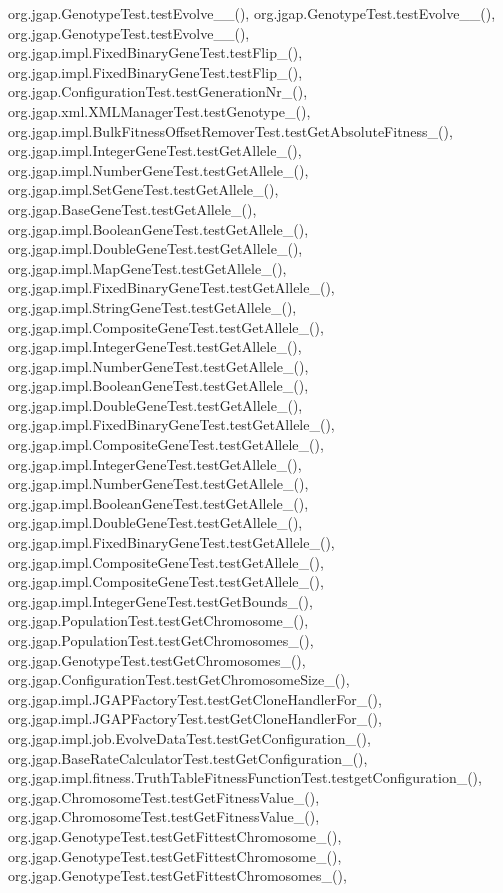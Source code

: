 org.\-jgap.\-Genotype\-Test.\-test\-Evolve\-\_\-\_(), org.\-jgap.\-Genotype\-Test.\-test\-Evolve\-\_\-\_(), org.\-jgap.\-Genotype\-Test.\-test\-Evolve\-\_\-\_(), org.\-jgap.\-impl.\-Fixed\-Binary\-Gene\-Test.\-test\-Flip\-\_(), org.\-jgap.\-impl.\-Fixed\-Binary\-Gene\-Test.\-test\-Flip\-\_(), org.\-jgap.\-Configuration\-Test.\-test\-Generation\-Nr\-\_(), org.\-jgap.\-xml.\-X\-M\-L\-Manager\-Test.\-test\-Genotype\-\_(), org.\-jgap.\-impl.\-Bulk\-Fitness\-Offset\-Remover\-Test.\-test\-Get\-Absolute\-Fitness\-\_(), org.\-jgap.\-impl.\-Integer\-Gene\-Test.\-test\-Get\-Allele\-\_(), org.\-jgap.\-impl.\-Number\-Gene\-Test.\-test\-Get\-Allele\-\_(), org.\-jgap.\-impl.\-Set\-Gene\-Test.\-test\-Get\-Allele\-\_(), org.\-jgap.\-Base\-Gene\-Test.\-test\-Get\-Allele\-\_(), org.\-jgap.\-impl.\-Boolean\-Gene\-Test.\-test\-Get\-Allele\-\_(), org.\-jgap.\-impl.\-Double\-Gene\-Test.\-test\-Get\-Allele\-\_(), org.\-jgap.\-impl.\-Map\-Gene\-Test.\-test\-Get\-Allele\-\_(), org.\-jgap.\-impl.\-Fixed\-Binary\-Gene\-Test.\-test\-Get\-Allele\-\_(), org.\-jgap.\-impl.\-String\-Gene\-Test.\-test\-Get\-Allele\-\_(), org.\-jgap.\-impl.\-Composite\-Gene\-Test.\-test\-Get\-Allele\-\_(), org.\-jgap.\-impl.\-Integer\-Gene\-Test.\-test\-Get\-Allele\-\_(), org.\-jgap.\-impl.\-Number\-Gene\-Test.\-test\-Get\-Allele\-\_(), org.\-jgap.\-impl.\-Boolean\-Gene\-Test.\-test\-Get\-Allele\-\_(), org.\-jgap.\-impl.\-Double\-Gene\-Test.\-test\-Get\-Allele\-\_(), org.\-jgap.\-impl.\-Fixed\-Binary\-Gene\-Test.\-test\-Get\-Allele\-\_(), org.\-jgap.\-impl.\-Composite\-Gene\-Test.\-test\-Get\-Allele\-\_(), org.\-jgap.\-impl.\-Integer\-Gene\-Test.\-test\-Get\-Allele\-\_(), org.\-jgap.\-impl.\-Number\-Gene\-Test.\-test\-Get\-Allele\-\_(), org.\-jgap.\-impl.\-Boolean\-Gene\-Test.\-test\-Get\-Allele\-\_(), org.\-jgap.\-impl.\-Double\-Gene\-Test.\-test\-Get\-Allele\-\_(), org.\-jgap.\-impl.\-Fixed\-Binary\-Gene\-Test.\-test\-Get\-Allele\-\_(), org.\-jgap.\-impl.\-Composite\-Gene\-Test.\-test\-Get\-Allele\-\_(), org.\-jgap.\-impl.\-Composite\-Gene\-Test.\-test\-Get\-Allele\-\_(), org.\-jgap.\-impl.\-Integer\-Gene\-Test.\-test\-Get\-Bounds\-\_(), org.\-jgap.\-Population\-Test.\-test\-Get\-Chromosome\-\_(), org.\-jgap.\-Population\-Test.\-test\-Get\-Chromosomes\-\_(), org.\-jgap.\-Genotype\-Test.\-test\-Get\-Chromosomes\-\_(), org.\-jgap.\-Configuration\-Test.\-test\-Get\-Chromosome\-Size\-\_(), org.\-jgap.\-impl.\-J\-G\-A\-P\-Factory\-Test.\-test\-Get\-Clone\-Handler\-For\-\_(), org.\-jgap.\-impl.\-J\-G\-A\-P\-Factory\-Test.\-test\-Get\-Clone\-Handler\-For\-\_(), org.\-jgap.\-impl.\-job.\-Evolve\-Data\-Test.\-test\-Get\-Configuration\-\_(), org.\-jgap.\-Base\-Rate\-Calculator\-Test.\-test\-Get\-Configuration\-\_(), org.\-jgap.\-impl.\-fitness.\-Truth\-Table\-Fitness\-Function\-Test.\-testget\-Configuration\-\_(), org.\-jgap.\-Chromosome\-Test.\-test\-Get\-Fitness\-Value\-\_(), org.\-jgap.\-Chromosome\-Test.\-test\-Get\-Fitness\-Value\-\_(), org.\-jgap.\-Genotype\-Test.\-test\-Get\-Fittest\-Chromosome\-\_(), org.\-jgap.\-Genotype\-Test.\-test\-Get\-Fittest\-Chromosome\-\_(), org.\-jgap.\-Genotype\-Test.\-test\-Get\-Fittest\-Chromosomes\-\_(), 